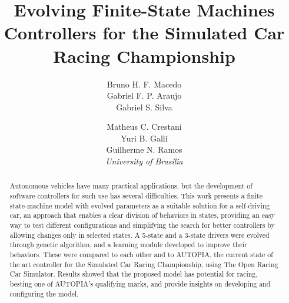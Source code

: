 \documentclass[a4paper]{sbgames}
\title{Evolving Finite-State Machines Controllers for the Simulated Car Racing Championship}
\author{Bruno H. F. Macedo\\Gabriel F. P. Araujo\\Gabriel S. Silva\\\and Matheus C. Crestani\\Yuri B. Galli\\Guilherme N. Ramos\\\hspace{-12em}\textit{University of Bras\'{i}lia}}
\begin{document}
	\maketitle

	\begin{abstract}
		Autonomous vehicles have many practical applications, but the development of software controllers for such use has several difficulties. This work presents a finite state-machine model with evolved parameters as a suitable solution for a self-driving car, an approach that enables a clear division of behaviors in states, providing an easy way to test different configurations and simplifying the search for better controllers by allowing changes only in selected states. A 5-state and a 3-state drivers were evolved through genetic algorithm, and a learning module developed to improve their behaviors. These were compared to each other and to AUTOPIA, the current state of the art controller for the Simulated Car Racing Championship, using The Open Racing Car Simulator. Results showed that the proposed model has potential for racing, besting one of AUTOPIA's qualifying marks, and provide insights on developing and configuring the model.
	\end{abstract}

	\keywordlist
	\contactlist

	\FloatBarrier%


	
	
\end{document}
